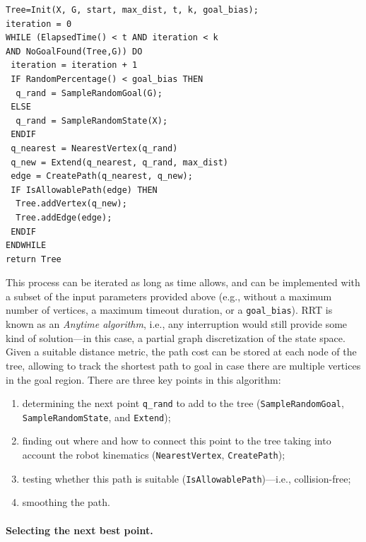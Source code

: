 \begin{center}
\begin{minipage}{0.8\linewidth}
\begin{verbatim}
Tree=Init(X, G, start, max_dist, t, k, goal_bias);
iteration = 0
WHILE (ElapsedTime() < t AND iteration < k 
AND NoGoalFound(Tree,G)) DO
 iteration = iteration + 1
 IF RandomPercentage() < goal_bias THEN
  q_rand = SampleRandomGoal(G);
 ELSE
  q_rand = SampleRandomState(X);
 ENDIF
 q_nearest = NearestVertex(q_rand)
 q_new = Extend(q_nearest, q_rand, max_dist)
 edge = CreatePath(q_nearest, q_new);
 IF IsAllowablePath(edge) THEN
  Tree.addVertex(q_new);
  Tree.addEdge(edge);
 ENDIF
ENDWHILE
return Tree
\end{verbatim}
\end{minipage}
\end{center}

This process can be iterated as long as time allows, and can be implemented with a subset of the input parameters provided above (e.g., without a maximum number of vertices, a maximum timeout duration, or a \texttt{goal\_bias}). RRT is known as an \textsl{Anytime algorithm}, i.e., any interruption would still provide some kind of solution---in this case, a partial graph discretization of the state space. Given a suitable distance metric, the path cost can be stored at each node of the tree, allowing to track the shortest path to goal in case there are multiple vertices in the goal region.
There are three key points in this algorithm:

\begin{enumerate}
    \item determining the next point \texttt{q\_rand} to add to the tree (\texttt{SampleRandomGoal}, \texttt{SampleRandomState}, and \texttt{Extend});
    \item finding out where and how to connect this point to the tree taking into account the robot kinematics (\texttt{NearestVertex}, \texttt{CreatePath});
    \item testing whether this path is suitable (\texttt{IsAllowablePath})---i.e., collision-free;
    \item smoothing the path.
\end{enumerate}

\paragraph{Selecting the next best point.}

